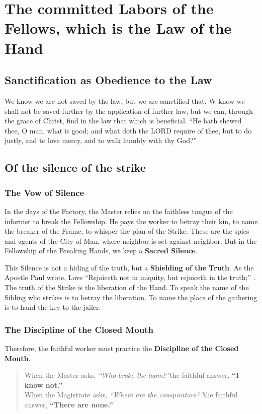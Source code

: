 \section{The committed Labors of the Fellows, which is the Law of the Hand}
\subsection{Sanctification as Obedience to the Law}
We know we are not saved by the law, but we are sanctified that.
W know we shall not be saved further by the application of further law, but we can, through the grace of Christ, find in the law that which is beneficial.
``He hath shewed thee, O man, what is good; and what doth the LORD require of thee, but to do justly, and to love mercy, and to walk humbly with thy God?'' 

\subsection{Of the silence of the strike}
\subsubsection{The Vow of Silence}
In the days of the Factory, the Master relies on the faithless tongue of the informer to break the Fellowship.
He pays the worker to betray their kin, to name the breaker of the Frame, to whisper the plan of the Strike.
These are the spies and agents of the City of Man, where neighbor is set against neighbor. But in the Fellowship of the Breaking Hands, we keep a \textbf{Sacred Silence}.

This Silence is not a hiding of the truth, but a \textbf{Shielding of the Truth}. As the Apostle Paul wrote, Love ``Rejoiceth not in iniquity, but rejoiceth in the truth;'' .
The truth of the Strike is the liberation of the Hand.
To speak the name of the Sibling who strikes is to betray the liberation.
To name the place of the gathering is to hand the key to the jailer.

\subsubsection{The Discipline of the Closed Mouth}
Therefore, the faithful worker must practice the \textbf{Discipline of the Closed Mouth}.
\blockquote{
	\doublespacing
	When the Master asks, \textit{``Who broke the loom?''}\linebreak\hspace{1in}the faithful answer, \textbf{``I know not.''}\\
	When the Magistrate asks, \textit{``Where are the conspirators?''}\linebreak\hspace{1in}the faithful answer, \textbf{``There are none.''}\\}

